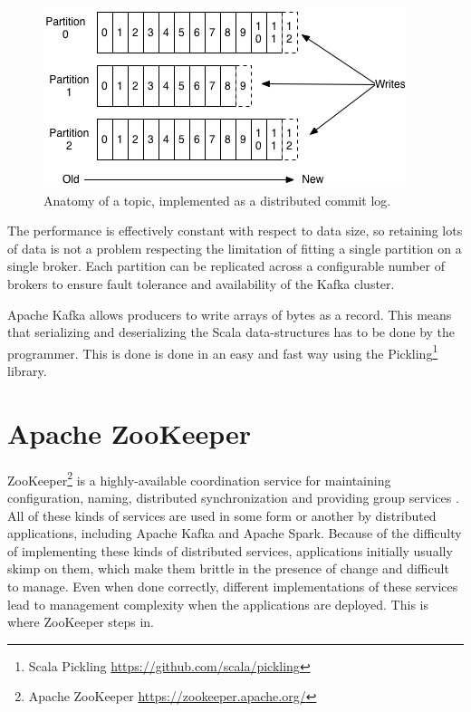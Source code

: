 \begin{figure}[ht!]
\centering
\includegraphics[width=.9\textwidth]{figures/kafkalog.jpg}
\caption{Anatomy of a topic, implemented as a distributed commit log\label{fig:kafkalog}.}
\end{figure}

The performance is effectively constant with respect to data size, so retaining lots of data is not a problem respecting the limitation of fitting a single partition on a single broker. Each partition can be replicated across a configurable number of brokers to ensure fault tolerance and availability of the Kafka cluster.

Apache Kafka allows producers to write arrays of bytes as a record. This means that serializing and deserializing the Scala data-structures has to be done by the programmer. This is done is done in an easy and fast way using the Pickling\footnote{Scala Pickling \url{https://github.com/scala/pickling}} library. 

\section{Apache ZooKeeper \label{subsec_ZooKeeper}}

ZooKeeper\footnote{Apache ZooKeeper \url{https://zookeeper.apache.org/}} is a highly-available coordination service for maintaining configuration, naming, distributed synchronization and providing group services \cite{Hunt:2010}. All of these kinds of services are used in some form or another by distributed applications, including Apache Kafka and Apache Spark. Because of the difficulty of implementing these kinds of distributed services, applications initially usually skimp on them, which make them brittle in the presence of change and difficult to manage. Even when done correctly, different implementations of these services lead to management complexity when the applications are deployed. This is where ZooKeeper steps in.

